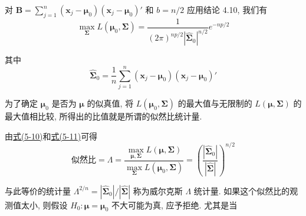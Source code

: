 对 $\mathbf{B}=\sum_{j=1}^{n}(\mathbf{x}_j-\boldsymbol{\mu}_0)(\mathbf{x}_j-\boldsymbol{\mu}_0)'$ 和 $b=n/2$ 应用结论 4.10, 我们有
\label{eq:5-11}
\begin{equation}
\max_{\boldsymbol{\Sigma}}L(\boldsymbol{\mu}_0,\boldsymbol{\Sigma})=\frac{1}{(2\pi)^{np/2}|\hat{\boldsymbol{\Sigma}}_0|^{n/2}}e^{-np/2} \tag{5-11}
\end{equation}

其中
\[
\hat{\boldsymbol{\Sigma}}_0=\frac{1}{n}\sum_{j=1}^{n}(\mathbf{x}_j-\boldsymbol{\mu}_0)(\mathbf{x}_j-\boldsymbol{\mu}_0)'
\]

为了确定 $\boldsymbol{\mu}_0$ 是否为 $\boldsymbol{\mu}$ 的似真值, 将 $L(\boldsymbol{\mu}_0,\boldsymbol{\Sigma})$ 的最大值与无限制的 $L(\boldsymbol{\mu},\boldsymbol{\Sigma})$ 的最大值相比较, 所得出的比值就是所谓的似然比统计量.

由\hyperref[eq:5-10]{式(5-10)}和\hyperref[eq:5-11]{式(5-11)}可得
\label{eq:5-12}
\begin{equation}
\text{似然比}=\Lambda=\frac{\max_{\boldsymbol{\mu},\boldsymbol{\Sigma}}L(\boldsymbol{\mu},\boldsymbol{\Sigma})}{\max_{\boldsymbol{\Sigma}}L(\boldsymbol{\mu}_0,\boldsymbol{\Sigma})}=\left(\frac{|\hat{\boldsymbol{\Sigma}}_0|}{|\hat{\boldsymbol{\Sigma}}|}\right)^{n/2} \tag{5-12}
\end{equation}

与此等价的统计量 $\Lambda^{2/n}=|\hat{\boldsymbol{\Sigma}}_0|/|\hat{\boldsymbol{\Sigma}}|$ 称为威尔克斯 $\Lambda$ 统计量. 如果这个似然比的观测值太小, 则假设 $H_0: \boldsymbol{\mu}=\boldsymbol{\mu}_0$ 不大可能为真, 应予拒绝. 尤其是当
